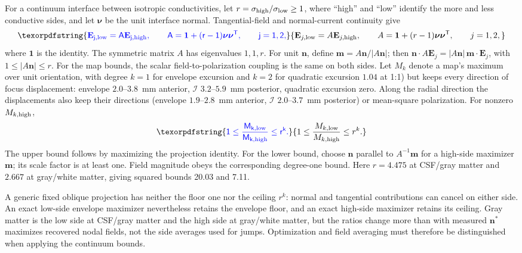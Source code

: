 \documentclass[11pt,a4paper]{article}
\providecommand{\DIFaddtex}[1]{{\protect\color{blue} \sf #1}} %
\providecommand{\DIFdeltex}[1]{{\protect\color{red} \scriptsize #1}} %
\providecommand{\DIFaddbegin}{} %
\providecommand{\DIFaddend}{} %
\providecommand{\DIFdelbegin}{} %
\providecommand{\DIFdelend}{} %
\providecommand{\DIFadd}[1]{\texorpdfstring{\DIFaddtex{#1}}{#1}} %
\providecommand{\DIFdel}[1]{\texorpdfstring{\DIFdeltex{#1}}{}} %
\begin{document}
\DIFadd{For a continuum interface between isotropic conductivities, let
$r=\sigma_{\rm high}/\sigma_{\rm low}\geq1$, where ``high'' and ``low''
identify the more and less conductive sides, and let $\boldsymbol\nu$ be
the unit interface normal. Tangential-field and normal-current continuity give
}\begin{equation}
\DIFadd{\mathbf E_{j,\rm low}=A\mathbf E_{j,\rm high},\qquad
A=\mathbf 1+(r-1)\boldsymbol\nu\boldsymbol\nu^{\mathsf T},\qquad j=1,2,
\label{eq:fem-interface-transform}
}\end{equation}
\DIFadd{where $\mathbf 1$ is the identity. The symmetric matrix $A$ has eigenvalues
$1,1,r$. For unit $\mathbf n$, define
$\mathbf m=A\mathbf n/|A\mathbf n|$; then
$\mathbf n\cdot A\mathbf E_j=|A\mathbf n|\,\mathbf m\cdot\mathbf E_j$,
with $1\leq|A\mathbf n|\leq r$.
For the map bounds, the scalar field-to-polarization coupling is the same
on both sides. Let $M_k$ denote a map's maximum over unit orientation, with degree $k=1$
for envelope excursion and $k=2$ for }\DIFaddend quadratic excursion \DIFdelbegin \DIFdel{$1.04$
at
1:1) but keeps every direction of focus displacement: envelope $2.0$--$3.8$~mm anterior, $\mathcal I$ $3.2$--$5.9$~mm posterior, quadratic excursion zero.
Along the radial direction the displacements also keep their directions (envelope $1.9$--$2.8$~mm
anterior,
$\mathcal I$ $2.0$--$3.7$~mm posterior)}\DIFdelend \DIFaddbegin \DIFadd{or mean-square
polarization. For nonzero $M_{k,\rm high}$}\DIFaddend ,
\DIFaddbegin \begin{equation}
\DIFadd{1\leq\frac{M_{k,\rm low}}{M_{k,\rm high}}\leq r^k.
\label{eq:fem-interface-bound}
}\end{equation}
\DIFadd{The upper bound follows by maximizing the projection identity. For the lower
bound, choose $\mathbf n$ parallel to $A^{-1}\mathbf m$ for a high-side
maximizer $\mathbf m$; its scale factor is at least one. Field magnitude
obeys the corresponding degree-one bound. Here $r=4.475$ at CSF/gray matter
and $2.667$ at gray/white matter, giving squared bounds 20.03 and 7.11.
}

\DIFadd{A generic fixed oblique projection has neither the floor one nor the ceiling
$r^k$: normal and tangential contributions can cancel on either side.
An exact low-side envelope maximizer nevertheless retains the envelope floor,
and an exact high-side maximizer retains its ceiling. Gray matter is the
low side at CSF/gray matter and the high side at gray/white matter, }\DIFaddend but the
\DIFdelbegin \DIFdel{ratios change more than with }\DIFdelend \DIFaddbegin \DIFadd{measured $\mathbf n^*$ maximizes recovered nodal fields, not the side averages
used for jumps. Optimization and field averaging must therefore be
distinguished when applying the continuum bounds.
}
\end{document}
